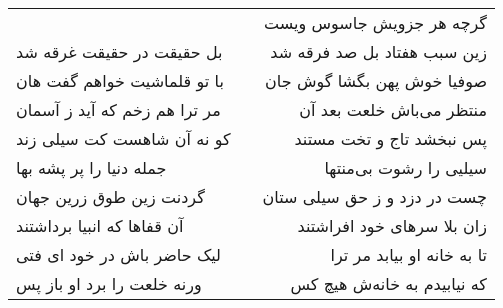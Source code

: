 \begin{center}
\begin{longtable}{l p{0.5cm} r}
&&
گرچه هر جزویش جاسوس ویست
\\
بل حقیقت در حقیقت غرقه شد
&&
زین سبب هفتاد بل صد فرقه شد
\\
با تو قلماشیت خواهم گفت هان
&&
صوفیا خوش پهن بگشا گوش جان
\\
مر ترا هم زخم که آید ز آسمان
&&
منتظر می‌باش خلعت بعد آن
\\
کو نه آن شاهست کت سیلی زند
&&
پس نبخشد تاج و تخت مستند
\\
جمله دنیا را پر پشه بها
&&
سیلیی را رشوت بی‌منتها
\\
گردنت زین طوق زرین جهان
&&
چست در دزد و ز حق سیلی ستان
\\
آن قفاها که انبیا برداشتند
&&
زان بلا سرهای خود افراشتند
\\
لیک حاضر باش در خود ای فتی
&&
تا به خانه او بیابد مر ترا
\\
ورنه خلعت را برد او باز پس
&&
که نیابیدم به خانه‌ش هیچ کس
\\
\end{longtable}
\end{center}
